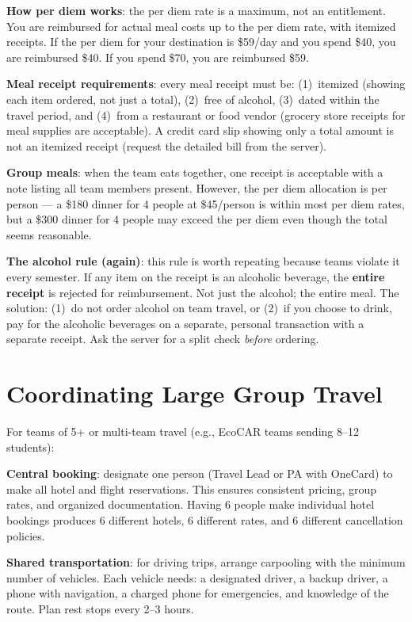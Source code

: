 \textbf{How per diem works}: the per diem rate is a maximum, not an entitlement. You are reimbursed for actual meal costs up to the per diem rate, with itemized receipts. If the per diem for your destination is \$59/day and you spend \$40, you are reimbursed \$40. If you spend \$70, you are reimbursed \$59.

\textbf{Meal receipt requirements}: every meal receipt must be: (1)~itemized (showing each item ordered, not just a total), (2)~free of alcohol, (3)~dated within the travel period, and (4)~from a restaurant or food vendor (grocery store receipts for meal supplies are acceptable). A credit card slip showing only a total amount is not an itemized receipt (request the detailed bill from the server).

\textbf{Group meals}: when the team eats together, one receipt is acceptable with a note listing all team members present. However, the per diem allocation is per person --- a \$180 dinner for 4 people at \$45/person is within most per diem rates, but a \$300 dinner for 4 people may exceed the per diem even though the total seems reasonable.

\textbf{The alcohol rule (again)}: this rule is worth repeating because teams violate it every semester. If any item on the receipt is an alcoholic beverage, the \textbf{entire receipt} is rejected for reimbursement. Not just the alcohol; the entire meal. The solution: (1)~do not order alcohol on team travel, or (2)~if you choose to drink, pay for the alcoholic beverages on a separate, personal transaction with a separate receipt. Ask the server for a split check \emph{before} ordering.

\section{Coordinating Large Group Travel}
For teams of 5+ or multi-team travel (e.g., EcoCAR teams sending 8--12 students):

\textbf{Central booking}: designate one person (Travel Lead or PA with OneCard) to make all hotel and flight reservations. This ensures consistent pricing, group rates, and organized documentation. Having 6 people make individual hotel bookings produces 6 different hotels, 6 different rates, and 6 different cancellation policies.

\textbf{Shared transportation}: for driving trips, arrange carpooling with the minimum number of vehicles. Each vehicle needs: a designated driver, a backup driver, a phone with navigation, a charged phone for emergencies, and knowledge of the route. Plan rest stops every 2--3 hours.

